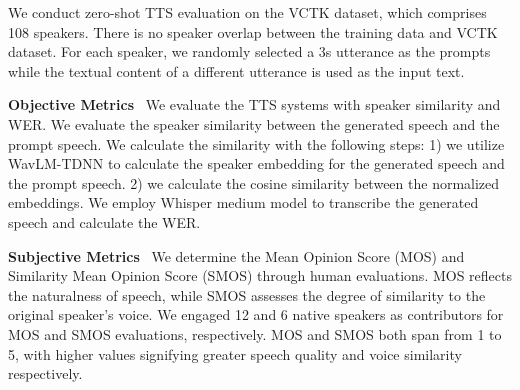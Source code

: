 We conduct zero-shot TTS evaluation on the VCTK dataset, which comprises 108 speakers. There is no speaker overlap between the training data and VCTK dataset. For each speaker, we randomly selected a 3s utterance as the prompts while the textual content of a different utterance is used as the input text. 

\textbf{Objective Metrics}~
We evaluate the TTS systems with speaker similarity and WER.
We evaluate the speaker similarity
between the generated speech and the prompt speech. We calculate the similarity with the following steps: 1)  we utilize WavLM-TDNN to calculate the speaker embedding for the generated speech and the prompt speech. 2) we calculate the cosine similarity between the normalized embeddings. 
We employ Whisper medium model to transcribe the generated speech and calculate
the WER.

\textbf{Subjective Metrics}~
We determine the Mean Opinion Score (MOS) and Similarity Mean Opinion Score (SMOS) through human evaluations. MOS reflects the naturalness of speech, while SMOS assesses the degree of similarity to the original speaker's voice. We engaged 12 and 6 native speakers as contributors for MOS and SMOS evaluations, respectively. MOS and SMOS both span from 1 to 5, with higher values signifying greater speech quality and voice similarity respectively.